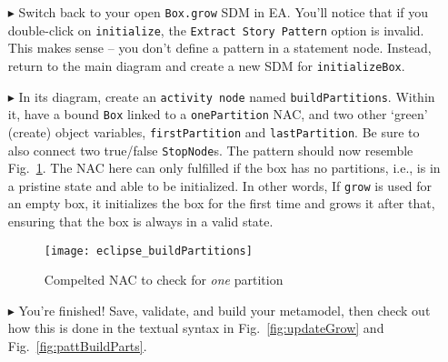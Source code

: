 \begin{itemize}
\clearpage

\item[$\blacktriangleright$] Switch back to your open \texttt{Box.grow} SDM in EA. You'll notice that if you double-click on \texttt{initialize}, the
\texttt{Extract Story Pattern} option is invalid. This makes sense -- you don't define a pattern in a statement node. Instead, return to the main diagram and
create a new SDM for \texttt{initializeBox}.

\item[$\blacktriangleright$] In its diagram, create an \texttt{activity node} named \texttt{buildPartitions}. Within it, have a bound \texttt{Box} linked to a
\texttt{onePartition} NAC, and two other `green' (create) object variables, \texttt{firstPartition} and \texttt{lastPartition}. Be sure to also connect two
true/false \texttt{StopNode}s. The pattern should now resemble Fig.~\ref{fig:buildPartitions}. The NAC here can only fulfilled if the box has no partitions,
i.e., is in a pristine state and able to be initialized. In other words, If \texttt{grow} is used for an empty box, it initializes the box for the first time
and grows it after that, ensuring that the box is always in a valid state.

\vspace{0.5cm}
 
\begin{figure}[htp]
\begin{center}
  \texttt{[image: eclipse\_buildPartitions]}
  \caption{Compelted NAC to check for \emph{one} partition}
  \label{fig:buildPartitions}
\end{center}
\end{figure}
 
\item[$\blacktriangleright$] You're finished! Save, validate, and build your metamodel, then check out how this is done in the textual syntax in
Fig.~\ref{fig:updateGrow} and Fig.~\ref{fig:pattBuildParts}.


\end{itemize}

